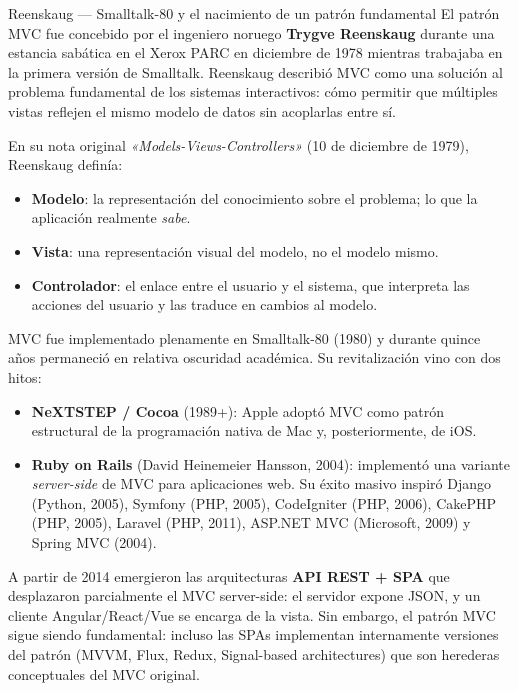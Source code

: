 \begin{cajahistoria}{Reenskaug --- Smalltalk-80 y el nacimiento de un patrón fundamental}
El patrón MVC fue concebido por el ingeniero noruego \textbf{Trygve
Reenskaug} durante una estancia sabática en el Xerox PARC en
diciembre de 1978 mientras trabajaba en la primera versión de
Smalltalk. Reenskaug describió MVC como una solución al problema
fundamental de los sistemas interactivos: cómo permitir que múltiples
vistas reflejen el mismo modelo de datos sin acoplarlas entre sí.

En su nota original \emph{«Models-Views-Controllers»} (10 de
diciembre de 1979), Reenskaug definía:

\begin{itemize}
\item \textbf{Modelo}: la representación del conocimiento sobre el
problema; lo que la aplicación realmente \emph{sabe}.
\item \textbf{Vista}: una representación visual del modelo, no el
modelo mismo.
\item \textbf{Controlador}: el enlace entre el usuario y el sistema,
que interpreta las acciones del usuario y las traduce en cambios al
modelo.
\end{itemize}

MVC fue implementado plenamente en Smalltalk-80 (1980) y durante
quince años permaneció en relativa oscuridad académica. Su
revitalización vino con dos hitos:

\begin{itemize}
\item \textbf{NeXTSTEP / Cocoa} (1989+): Apple adoptó MVC como
patrón estructural de la programación nativa de Mac y, posteriormente,
de iOS.
\item \textbf{Ruby on Rails} (David Heinemeier Hansson, 2004):
implementó una variante \emph{server-side} de MVC para aplicaciones
web. Su éxito masivo inspiró Django (Python, 2005), Symfony
(PHP, 2005), CodeIgniter (PHP, 2006), CakePHP (PHP, 2005), Laravel
(PHP, 2011), ASP.NET MVC (Microsoft, 2009) y Spring MVC (2004).
\end{itemize}

A partir de 2014 emergieron las arquitecturas \textbf{API REST + SPA}
que desplazaron parcialmente el MVC server-side: el servidor expone
JSON, y un cliente Angular/React/Vue se encarga de la vista. Sin
embargo, el patrón MVC sigue siendo fundamental: incluso las SPAs
implementan internamente versiones del patrón (MVVM, Flux, Redux,
Signal-based architectures) que son herederas conceptuales del MVC
original.
\end{cajahistoria}

